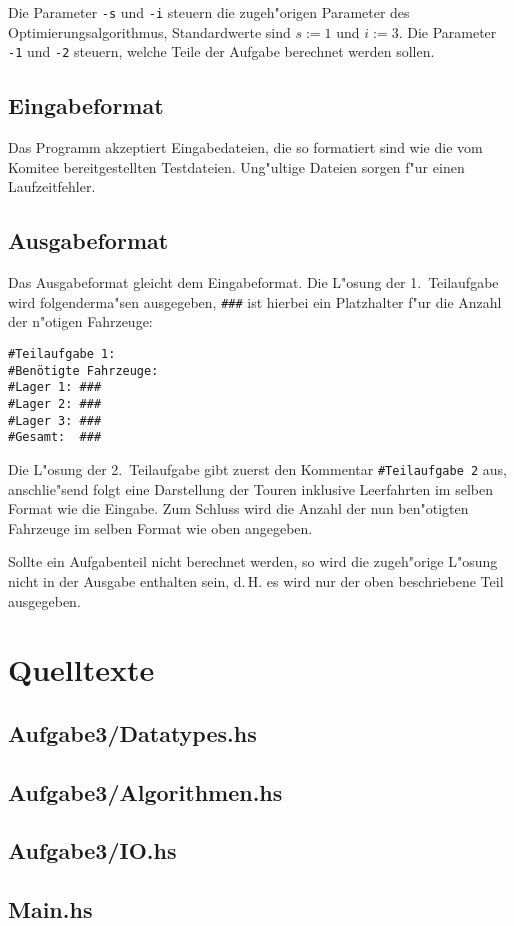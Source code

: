 \documentclass{scrreprt}
\begin{document}
Die Parameter \texttt{-s} und \texttt{-i} steuern die zugeh"origen Parameter des
Optimierungsalgorithmus, Standardwerte sind $s := 1$ und $i := 3$. Die Parameter
\texttt{-1} und \texttt{-2} steuern, welche Teile der Aufgabe berechnet werden
sollen.

\section{Eingabeformat}
Das Programm akzeptiert Eingabedateien, die so formatiert sind wie die vom
Komitee bereitgestellten Testdateien.  Ung"ultige Dateien sorgen f"ur einen
Laufzeitfehler.

\section{Ausgabeformat}
Das Ausgabeformat gleicht dem Eingabeformat.  Die L"osung der 1.\ Teilaufgabe
wird folgenderma"sen ausgegeben, \texttt{\#\#\#} ist hierbei ein Platzhalter
f"ur die Anzahl der n"otigen Fahrzeuge:

\begin{verbatim}
#Teilaufgabe 1:
#Benötigte Fahrzeuge:
#Lager 1: ###
#Lager 2: ###
#Lager 3: ###
#Gesamt:  ###
\end{verbatim}

Die L"osung der 2.\ Teilaufgabe gibt zuerst den Kommentar \texttt{\#Teilaufgabe\ 
2} aus, anschlie"send folgt eine Darstellung der Touren inklusive Leerfahrten
im selben Format wie die Eingabe.  Zum Schluss wird die Anzahl der nun
ben"otigten Fahrzeuge im selben Format wie oben angegeben.

Sollte ein Aufgabenteil nicht berechnet werden, so wird die zugeh"orige L"osung
nicht in der Ausgabe enthalten sein, d.\,H. es wird nur der oben beschriebene
Teil ausgegeben.


\chapter{Quelltexte}

\section{Aufgabe3/Datatypes.hs}


\section{Aufgabe3/Algorithmen.hs}


\section{Aufgabe3/IO.hs}


\section{Main.hs}

\end{document}
